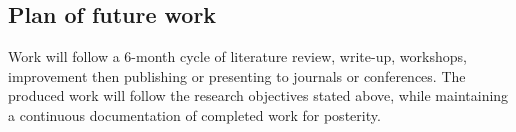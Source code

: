 \documentclass{article}
\begin{document}
\begin{multicols}{2}

\section{Plan of future work}
Work will follow a 6-month cycle of literature review, write-up, workshops, improvement then publishing or presenting to journals or conferences. The produced work will follow the research objectives stated above, while maintaining a continuous documentation of completed work for posterity.

\end{multicols}

\break
\printbibliography
\end{document}
